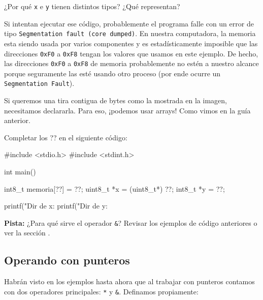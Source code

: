 \documentclass[]{scrartcl}
\begin{document}
\begin{exbox}[label=ejercicio3]
  ¿Por qué \texttt{x} e \texttt{y} tienen distintos tipos? ¿Qué representan?
\end{exbox}

Si intentan ejecutar ese código, probablemente el programa falle con un error de tipo \texttt{Segmentation fault (core dumped)}.
En nuestra computadora, la memoria esta siendo usada por varios componentes y es estadísticamente imposible que las direcciones \texttt{0xF0} a \texttt{0xF8} tengan los valores que usamos en este ejemplo.
De hecho, las direcciones \texttt{0xF0} a \texttt{0xF8} de memoria probablemente no estén a nuestro alcance porque seguramente las esté usando otro proceso (por ende ocurre un \texttt{Segmentation Fault}).

Si queremos una tira contigua de bytes como la mostrada en la imagen, necesitamos declararla.
Para eso, ¡podemos usar arrays! Como vimos en la guía anterior.

\begin{exbox}[label=ejercicio4]
  Completar los ?? en el siguiente código:

  \begin{cbox}[unbreakable]{}
    #include <stdio.h>
    #include <stdint.h>

    int main(){
        int8_t memoria[??] = ??;
        uint8_t *x = (uint8_t*) ??;
        int8_t *y = ??;

        printf("Dir de x: %
        printf("Dir de y: %
    }
  \end{cbox}

  \textbf{Pista:} ¿Para qué sirve el operador \texttt{\&}? Revisar los ejemplos de código anteriores o ver la sección .
\end{exbox}

\subsection*{Operando con punteros} 
\label{sec:operadores}

Habrán visto en los ejemplos hasta ahora que al trabajar con punteros contamos con dos operadores principales: \texttt{*} y \texttt{\&}.
Definamos propiamente:
\end{document}
